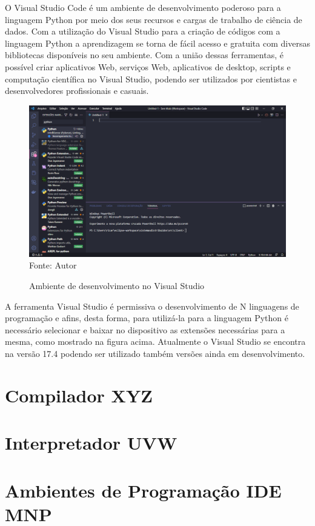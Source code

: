 O Visual Studio Code é um ambiente de desenvolvimento poderoso para a linguagem Python por meio dos seus recursos e cargas de trabalho de ciência de dados. Com a utilização do Visual Studio para a criação de códigos com a linguagem Python a aprendizagem se torna de fácil acesso e gratuita com diversas bibliotecas disponíveis no seu ambiente. Com a união dessas ferramentas, é possível criar aplicativos Web, serviços Web, aplicativos de desktop, scripts e computação científica no Visual Studio, podendo ser utilizados por cientistas e desenvolvedores profissionais e casuais.\\
  \begin{figure}[H]
	\begin{center}
		\caption{Ambiente de desenvolvimento no Visual Studio} \label{ling1}
		\includegraphics[width=15cm]{visualStudioPy.PNG} \\
		{\tiny \sf Fonte:{ Autor}}
	\end{center}
\end{figure}
A ferramenta Visual Studio é permissiva o desenvolvimento de N linguagens de programação e afins, desta forma, para utilizá-la para a linguagem Python é necessário selecionar e baixar no dispositivo as extensões necessárias para a mesma, como mostrado na figura acima. Atualmente o Visual Studio se encontra na versão 17.4 podendo ser utilizado também versões ainda em desenvolvimento.

    \section{Compilador XYZ}


    \section{Interpretador UVW}


    \section{Ambientes de Programa\c{c}\~{a}o IDE MNP} 